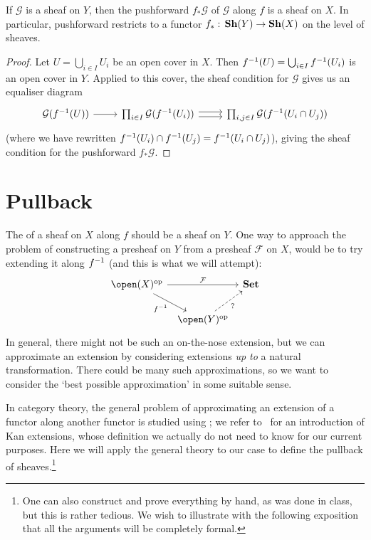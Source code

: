 \begin{lem}
If \(\mathcal G\) is a sheaf on \(Y\), then the pushforward \(f_*\mathcal G\) of \(\mathcal G\) along \(f\) is a sheaf on \(X\).
In particular, pushforward restricts to a functor \(f_*\colon\catSheaf(Y)\to\catSheaf(X)\) on the level of sheaves.
\end{lem}
\begin{proof}
Let \(U=\bigcup_{i\in I}U_i\) be an open cover in \(X\).
Then \(f^{-1}(U) = \bigcup_{i\in I}f^{-1}(U_i)\) is an open cover in \(Y\).
Applied to this cover, the sheaf condition for \(\mathcal G\) gives us an equaliser diagram
\begin{equation*}
  \begin{tikzcd}
    \mathcal G(f\inv(U)) \ar[r] & \prod_{i\in I}\mathcal G(f\inv(U_i)) \ar[r, shift left] \ar[r, shift right] & \prod_{i,j\in I}\mathcal G(f\inv(U_i\cap U_j))
  \end{tikzcd}
\end{equation*}
(where we have rewritten \(f^{-1}(U_i)\cap f^{-1}(U_j)=f^{-1}(U_i\cap U_j)\)), giving the sheaf condition for the pushforward \(f_*\mathcal G\).
\end{proof}

\section{Pullback}
\noindent
The  of a sheaf on \(X\) along \(f\) should be a sheaf on \(Y\).
One way to approach the problem of constructing a presheaf on \(Y\) from a presheaf \(\mathcal F\) on \(X\), would be to try extending it along \(f^{-1}\) (and this is what we will attempt):
\begin{equation*}
  \begin{tikzcd}[column sep=tiny]
    \open(X)\opp \ar[rr, "\mathcal F"] \ar[rd, "f\inv"'] & & \catSet \\
    & \open(Y)\opp \ar[ru, dashed, "?"']
  \end{tikzcd}
\end{equation*}
In general, there might not be such an on-the-nose extension, but we can approximate an extension by considering extensions \emph{up to} a natural transformation.
There could be many such approximations, so we want to consider the `best possible approximation' in some suitable sense.

In category theory, the general problem of approximating an extension of a functor along another functor is studied using ; we refer to~\cite[Chapter~6]{riehlCategoryTheoryContext2016} for an introduction of Kan extensions, whose definition we actually do not need to know for our current purposes.
Here we will apply the general theory to our case to define the pullback of sheaves.\footnote{One can also construct and prove everything by hand, as was done in class, but this is rather tedious. We wish to illustrate with the following exposition that all the arguments will be completely formal.}

